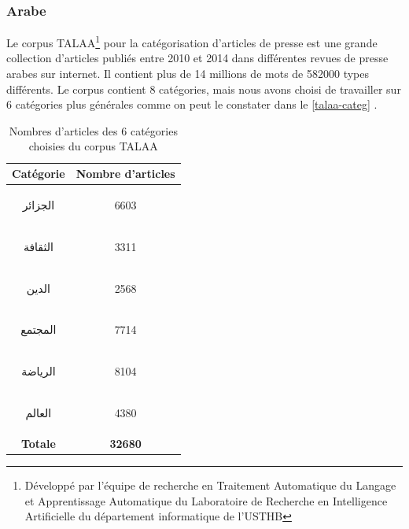     \subsubsection{Arabe}
    Le corpus TALAA\footnote{Développé par l'équipe de recherche en Traitement Automatique du Langage et Apprentissage Automatique du Laboratoire de Recherche en Intelligence Artificielle du département informatique de l'USTHB} pour la catégorisation d'articles de presse est une grande collection d'articles publiés entre 2010 et 2014 dans différentes revues de presse arabes sur internet. Il contient plus de 14 millions de mots de 582000 types différents. Le corpus contient 8 catégories, mais nous avons choisi de travailler sur 6 catégories plus générales comme on peut le constater dans le \autoref{talaa-categ} \cite{asma-sellab}. 
    \begin{table}[H]
        \begin{center}
            \begin{tabular}{|c|c|}
                \hline
                \textbf{Catégorie} &  \textbf{Nombre d'articles} \\
                \hline
                \begin{arab}الجزائر\end{arab} & 6603 \\
                \begin{arab}الثقافة\end{arab} & 3311 \\
                \begin{arab}الدين\end{arab} & 2568 \\
                \begin{arab}المجتمع\end{arab} & 7714 \\
                \begin{arab}الرياضة\end{arab} & 8104 \\
                \begin{arab}العالم\end{arab} & 4380 \\
                \textbf{Totale} & \textbf{32680} \\
                \hline
            \end{tabular}
        \end{center}
        \caption{Nombres d'articles des 6 catégories choisies du corpus \textquotedbl TALAA\textquotedbl}
        \label{talaa-categ}
    \end{table}

